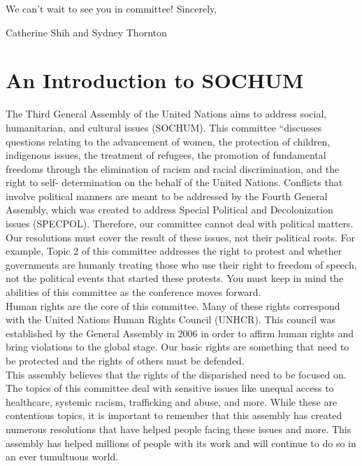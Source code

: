 \documentclass[10pt, letterpaper]{article}
\begin{document}
We can't wait to see you in committee! Sincerely,

Catherine Shih and Sydney Thornton

\newpage
\tableofcontents
\newpage

\section{{An Introduction to SOCHUM}}

The Third General Assembly of the United Nations aims to address social,
humanitarian, and cultural issues (SOCHUM). This committee ``discusses
questions relating to the advancement of women, the protection of
children, indigenous issues, the treatment of refugees, the promotion of
fundamental freedoms through the elimination of racism and racial
discrimination, and the right to self- determination on the behalf of
the United Nations. Conflicts that involve political manners are meant
to be addressed by the Fourth General Assembly, which was created to
address Special Political and Decolonization issues (SPECPOL).
Therefore, our committee cannot deal with political matters. Our
resolutions must cover the result of these issues, not their political
roots. For example, Topic 2 of this committee addresses the right to
protest and whether governments are humanly treating those who use their
right to freedom of speech, not the political events that started these
protests. You must keep in mind the abilities of this committee as the
conference moves forward. \\

Human rights are the core of this committee. Many of these rights
correspond with the United Nations Human Rights Council (UNHCR). This
council was established by the General Assembly in 2006 in order to
affirm human rights and bring violations to the global stage. Our basic
rights are something that need to be protected and the rights of others
must be defended. \\

This assembly believes that the rights of the disparished need to be
focused on. The topics of this committee deal with sensitive issues like
unequal access to healthcare, systemic racism, trafficking and abuse,
and more. While these are contentious topics, it is important to
remember that this assembly has created numerous resolutions that have
helped people facing these issues and more. This assembly has helped
millions of people with its work and will continue to do so in an ever
tumultuous world. \\
\end{document}
